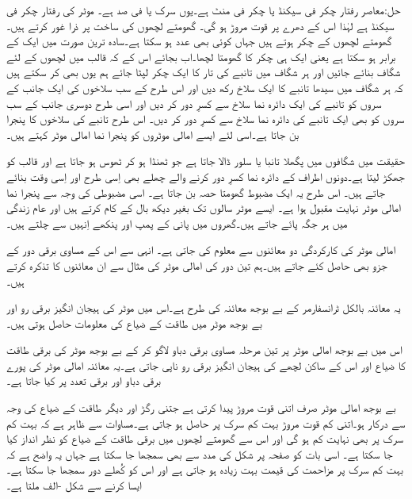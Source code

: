حل:معاصر رفتار  چکر فی سیکنڈ یا  چکر فی منٹ ہے۔یوں سرک   یا  فی صد ہے۔ موٹر کی رفتار   چکر فی سیکنڈ ہے لہٰذا اس کے  دھرے پر قوت مروڑ   ہو گی۔
%
گھومتے لچھوں کی ساخت پر ذرا غور کرتے ہیں۔ گھومتے لچھوں کے   چکر ہوتے ہیں جہاں  کوئی بھی عدد ہو سکتا ہے۔سادہ ترین صورت میں   ایک کے برابر ہو سکتا ہے یعنی ایک ہی چکر کا گھومتا لچھا۔اب بجائے اس کے کہ قالب میں لچھوں کے لئے شگاف بنائے جائیں اور ہر شگاف میں تانبے کی تار کا ایک چکر لپٹا جائے ہم یوں بھی کر سکتے ہیں کہ ہر شگاف میں سیدھا تانبے کا ایک سلاخ رکھ دیں اور اس طرح کے سب سلاخوں کی ایک جانب کے سروں کو تانبے کی ایک دائرہ نما سلاخ سے کسرِ دور کر دیں اور اسی طرح دوسری جانب کے سب سروں کو بھی ایک تانبے کی دائرہ نما سلاخ سے کسرِ  دور کر دیں۔ اس طرح تانبے کی سلاخوں کا پنجرا بن جاتا ہے۔اسی لئے ایسے امالی موٹروں کو پنجرا نما امالی موٹر کہتے ہیں۔

حقیقت میں شگافوں میں پگھلا تانبا یا سلور  ڈالا جاتا ہے جو ٹھنڈا ہو کر ٹھوس ہو جاتا ہے اور قالب کو جھکڑ لیتا ہے۔دونوں اطراف کے دائرہ نما کسرِ دور کرنے والے چھلے بھی اِسی طرح اور اِسی وقت بنائے جاتے ہیں۔  اس طرح یہ ایک مضبوط گھومتا حصہ بن جاتا ہے۔ اسی مضبوطی کی وجہ سے  پنجرا نما امالی موٹر نہایت مقبول ہوا ہے۔ ایسے موٹر سالوں تک بغیر دیکھ بال کے کام کرتے ہیں اور عام زندگی میں ہر جگہ پائے جاتے ہیں۔گھروں میں پانی کے پمپ اور پنکھے اِنہیں سے چلتے ہیں۔

امالی موٹر کی کارکردگی دو معائنوں سے معلوم کی جاتی ہے۔ انہی سے اس کے مساوی برقی دور کے جزو بھی حاصل کئے جاتے ہیں۔ہم تین دور کی امالی موٹر کی مثال سے ان معائنوں کا تذکرہ کرتے ہیں۔

یہ معائنہ بالکل ٹرانسفارمر کے بے بوجھ معائنہ کی طرح ہے۔اس میں موٹر کی ہیجان انگیز برقی رو اور بے بوجھ موٹر میں طاقت کے ضیاع کی معلومات حاصل ہوتی ہیں۔ 

اس میں  بے بوجھ امالی موٹر پر تین مرحلہ مساوی برقی دباو  لاگو کر کے بے بوجھ موٹر کی برقی طاقت کا ضیاع  اور اس کے ساکن لچھے  کی ہیجان انگیز برقی رو  ناپی جاتی ہے۔یہ معائنہ امالی موٹر کی پورے برقی دباو اور برقی تعدد پر کیا جاتا ہے۔

بے بوجھ امالی موٹر صرف اتنی قوت مروڑ پیدا کرتی ہے جتنی رگڑ اور دیگر طاقت کے ضیاع کی وجہ سے درکار ہو۔اتنی کم قوت مروڑ بہت کم سرک پر حاصل ہو جاتی ہے۔مساوات   سے ظاہر ہے کہ بہت کم سرک پر   بھی نہایت کم ہو گی  اور اس سے گھومتے لچھوں میں برقی طاقت کے ضیاع کو نظر انداز کیا جا سکتا ہے۔ اسی بات کو صفحہ  پر شکل   کی مدد سے بھی سمجھا جا سکتا ہے جہاں یہ واضح ہے کہ بہت کم سرک پر مزاحمت  کی قیمت بہت زیادہ ہو جاتی ہے اور اس کو کُھلے دور سمجھا جا سکتا ہے۔ایسا کرنے سے شکل -الف ملتا ہے۔

